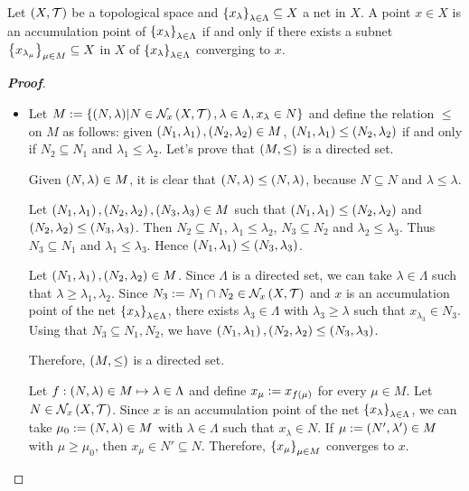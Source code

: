 \begin{proposition}
  Let $\left(X,\mathcal{T}\right)$ be a topological space and $\left\{x_\lambda\right\}_{\lambda\in\Lambda}\subseteq X$ a net in $X$. A point $x\in X$ is an accumulation point of $\left\{x_\lambda\right\}_{\lambda\in\Lambda}$ if and only if there exists a subnet $\left\{x_{\lambda_{\mu}}\right\}_{\mu\in M}\subseteq X$ in $X$ of $\left\{x_\lambda\right\}_{\lambda\in\Lambda}$ converging to $x$.

  \begin{proof}[\rm\textbf{Proof}]
    \hfill
    \begin{itemize}
      \item[\boxed{\Rightarrow}] Let $M:=\left\{\left(N,\lambda\right)\middle|N\in\mathcal{N}_{x}\left(X,\mathcal{T}\right),\lambda\in\Lambda,x_{\lambda}\in N\right\}$ and define the relation $\leq$ on $M$ as follows: given $\left(N_1,\lambda_1\right),\left(N_2,\lambda_2\right)\in M$, $\left(N_1,\lambda_1\right)\leq\left(N_2,\lambda_2\right)$ if and only if $N_2\subseteq N_1$ and $\lambda_1\leq\lambda_2$. Let's prove that $\left(M,\leq\right)$ is a directed set.
      
      Given $\left(N,\lambda\right)\in M$, it is clear that $\left(N,\lambda\right)\leq\left(N,\lambda\right)$, because $N\subseteq N$ and $\lambda\leq\lambda$. 

      Let $\left(N_1,\lambda_1\right),\left(N_2,\lambda_2\right),\left(N_3,\lambda_3\right)\in M$ such that $\left(N_1,\lambda_1\right)\leq\left(N_2,\lambda_2\right)$ and $\left(N_2,\lambda_2\right)\leq\left(N_3,\lambda_3\right)$. Then $N_2\subseteq N_1$, $\lambda_1\leq\lambda_2$, $N_3\subseteq N_2$ and $\lambda_2\leq\lambda_3$. Thus $N_3\subseteq N_1$ and $\lambda_1\leq\lambda_3$. Hence $\left(N_1,\lambda_1\right)\leq\left(N_3,\lambda_3\right)$.

      Let $\left(N_1,\lambda_1\right),\left(N_2,\lambda_2\right)\in M$. Since $\Lambda$ is a directed set, we can take $\lambda\in\Lambda$ such that $\lambda\geq\lambda_1,\lambda_2$. Since $N_3:=N_1\cap N_2\in\mathcal{N}_x\left(X,\mathcal{T}\right)$ and $x$ is an accumulation point of the net $\left\{x_{\lambda}\right\}_{\lambda\in\Lambda}$, there exists $\lambda_3\in\Lambda$ with $\lambda_3\geq\lambda$ such that $x_{\lambda_3}\in N_3$. Using that $N_3\subseteq N_1,N_2$, we have $\left(N_1,\lambda_1\right),\left(N_2,\lambda_2\right)\leq\left(N_3,\lambda_3\right)$.

      Therefore, $\left(M,\leq\right)$ is a directed set.

      Let $f:\left(N,\lambda\right)\in M\mapsto\lambda\in\Lambda$ and define $x_\mu:=x_{f\left(\mu\right)}$ for every $\mu\in M$. Let $N\in\mathcal{N}_x\left(X,\mathcal{T}\right)$. Since $x$ is an accumulation point of the net $\left\{x_\lambda\right\}_{\lambda\in\Lambda}$, we can take $\mu_0:=\left(N,\lambda\right)\in M$ with $\lambda\in\Lambda$ such that $x_{\lambda}\in N$. If $\mu:=\left(N',\lambda'\right)\in M$ with $\mu\geq\mu_0$, then $x_{\mu}\in N'\subseteq N$. Therefore, $\left\{x_{\mu}\right\}_{\mu\in M}$ converges to $x$.


\end{itemize}
\end{proof}
\end{proposition}
